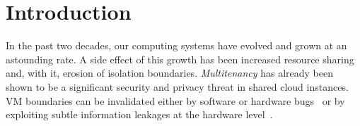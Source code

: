 
\section{Introduction}
In the past two decades, our computing systems have evolved and grown at an astounding rate. A side effect of this growth has been increased resource sharing and, with it, erosion of isolation boundaries. \textit{Multitenancy} has already been shown to be a significant security and privacy threat in shared cloud instances. VM boundaries can be invalidated either by software or hardware bugs~\cite{van2020lvi,islam2019spoiler,moghimi2020medusa,correia2018copycat} or by exploiting subtle information leakages at the hardware level~\cite{tpmfail}. 
%

